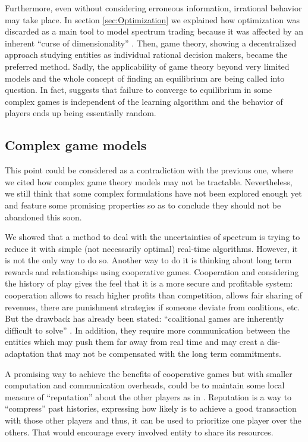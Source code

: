 Furthermore, even without considering erroneous information, irrational behavior may take place. 
In section \ref{sec:Optimization} we explained how optimization was discarded as a main tool to model spectrum trading because it was affected by an inherent ``curse of dimensionality'' .
Then, game theory, showing a decentralized approach studying entities as individual rational decision makers, became the preferred method. 
Sadly, the applicability of game theory beyond very limited models and the whole concept of finding an equilibrium are being called into question. 
In fact, \cite{ref:Galla2013} suggests that failure to converge to equilibrium in some complex games is independent of the learning algorithm and the behavior of players ends up being essentially random.

\subsection{Complex game models}

This point could be considered as a contradiction with the previous one, where we cited how complex game theory models may not be tractable.
Nevertheless, we still think that some complex formulations have not been explored enough yet and feature some promising properties so as to conclude they should not be abandoned this soon. 

We showed that a method to deal with the uncertainties of spectrum is trying to reduce it with simple (not necessarily optimal) real-time algorithms. 
However, it is not the only way to do so. 
Another way to do it is thinking about long term rewards and relationships using cooperative games. 
Cooperation and considering the history of play gives the feel that it is a more secure and profitable system: cooperation allows to reach higher profits than competition, allows fair sharing of revenues, there are punishment strategies if someone deviate from coalitions, etc. 
But the drawback has already been stated: ``coalitional games are inherently difficult to solve'' \cite{ref:Li2011}.  In addition, they require more communication between the entities which may push them far away from real time and may creat a dis-adaptation that may not be compensated with the long term commitments. 

A promising way to achieve the benefits of cooperative games but with smaller computation and communication overheads, could be to maintain some local measure of ``reputation'' about the other players as in \cite{ref:Yan2011}.
Reputation is a way to ``compress'' past histories, expressing how likely is to achieve a good transaction with those other players and thus, it can be used to prioritize one player over the others. 
That would encourage every involved entity to share its resources. 

